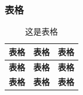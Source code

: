 \begin{ujnbody}
    \subsubsection{表格}

    \begin{table}[htbp]
        \centering
        \caption{这是表格}
        \begin{tabular}{|c|c|c|}
            \hline
            \multicolumn{1}{|c|}{\textbf{表格}} & \multicolumn{1}{c|}{\textbf{表格}} & \multicolumn{1}{c|}{\textbf{表格}} \\ \hline
            \multicolumn{1}{|c|}{\textbf{表格}} & \multicolumn{1}{c|}{\textbf{表格}} & \multicolumn{1}{c|}{\textbf{表格}} \\ \hline
            \multicolumn{1}{|c|}{\textbf{表格}} & \multicolumn{1}{c|}{\textbf{表格}} & \multicolumn{1}{c|}{\textbf{表格}} \\ \hline
        \end{tabular}
    \end{table}
\end{ujnbody}